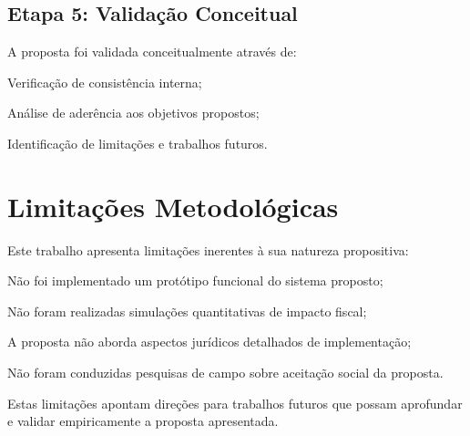 \subsection{Etapa 5: Validação Conceitual}

A proposta foi validada conceitualmente através de:
\begin{alineas}
    \item Verificação de consistência interna;
    \item Análise de aderência aos objetivos propostos;
    \item Identificação de limitações e trabalhos futuros.
\end{alineas}

\section{Limitações Metodológicas}

Este trabalho apresenta limitações inerentes à sua natureza propositiva:

\begin{alineas}
    \item Não foi implementado um protótipo funcional do sistema proposto;
    \item Não foram realizadas simulações quantitativas de impacto fiscal;
    \item A proposta não aborda aspectos jurídicos detalhados de implementação;
    \item Não foram conduzidas pesquisas de campo sobre aceitação social da proposta.
\end{alineas}

Estas limitações apontam direções para trabalhos futuros que possam aprofundar e validar empiricamente a proposta apresentada.

